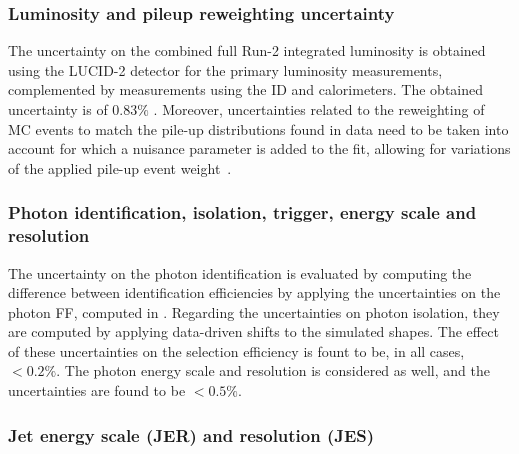 \subsubsection{Luminosity and pileup reweighting uncertainty}
The uncertainty on the combined full Run-2 integrated luminosity is obtained using the LUCID-2 detector \cite{ATLAS-LUCID2} for the primary luminosity measurements, complemented by measurements using the \ac{ID} and calorimeters. The obtained uncertainty is of \(0.83\%\) \cite{ATLAS-Lumi-Run2}. 
Moreover, uncertainties related to the reweighting of \ac{MC} events to match the pile-up distributions found in data need to be taken into account for which a nuisance parameter is added to the fit, allowing for variations of the applied pile-up event weight~\cite{ATLAS-PileupRW}.


\subsubsection{Photon identification, isolation, trigger, energy scale and resolution}
The uncertainty on the photon identification is evaluated by computing the difference between identification efficiencies by applying the uncertainties on the photon \ac{FF}, computed in \Ch{\ref{ch:ss_corrections}}.
Regarding the uncertainties on photon isolation, they are computed by applying data-driven shifts to the simulated \etiso shapes. The effect of these uncertainties on the selection efficiency is fount to be, in all cases, \(<0.2\%\).
The photon energy scale and resolution is considered as well, and the uncertainties are found to be \(<0.5\%\).



\subsubsection{Jet energy scale (JER) and resolution (JES)}

